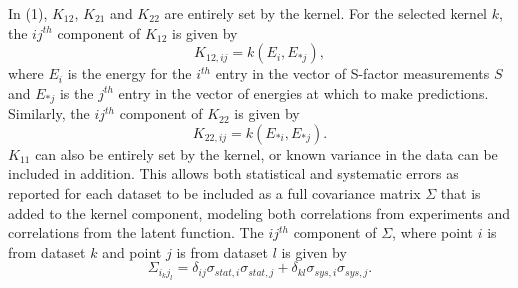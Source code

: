 \documentclass[%
 reprint,
superscriptaddress,
nofootinbib,
 amsmath,amssymb,
 aps,
 pra,
]{revtex4-2}
\begin{document}
In (1), $K_{12}$, $K_{21}$ and $K_{22}$ are entirely set by the kernel. For the selected kernel $k$, the $ij^{th}$ component of $K_{12}$ is given by
\begin{equation}
	K_{12,ij} = k(E_i, E_{*j}), \nonumber
\end{equation}
where $E_i$ is the energy for the $i^{th}$ entry in the vector of S-factor measurements $S$ and $E_{*j}$ is the $j^{th}$ entry in the vector of energies at which to make predictions. Similarly, the $ij^{th}$ component of $K_{22}$ is given by
\begin{equation}
	K_{22,ij} = k(E_{*i}, E_{*j}). \nonumber
\end{equation}
$K_{11}$ can also be entirely set by the kernel, or known variance in the data can be included in addition. This allows both statistical and systematic errors as reported for each dataset to be included as a full covariance matrix $\Sigma$ that is added to the kernel component, modeling both correlations from experiments and correlations from the latent function. The $ij^{th}$ component of $\Sigma$, where point $i$ is from dataset $k$ and point $j$ is from dataset $l$ is given by
\begin{equation}
	\Sigma_{i_k j_l} = \delta_{ij} \sigma_{stat,i} \sigma_{stat,j} + \delta_{kl} \sigma_{sys,i} \sigma_{sys,j}. \nonumber
\end{equation}
\end{document}
